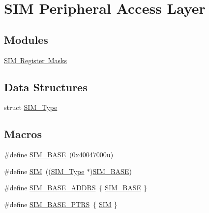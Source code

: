 \hypertarget{group___s_i_m___peripheral___access___layer}{}\section{S\+IM Peripheral Access Layer}
\label{group___s_i_m___peripheral___access___layer}
\subsection*{Modules}
\begin{DoxyCompactItemize}
\item 
\mbox{\hyperlink{group___s_i_m___register___masks}{S\+I\+M Register Masks}}
\end{DoxyCompactItemize}
\subsection*{Data Structures}
\begin{DoxyCompactItemize}
\item 
struct \mbox{\hyperlink{struct_s_i_m___type}{S\+I\+M\+\_\+\+Type}}
\end{DoxyCompactItemize}
\subsection*{Macros}
\begin{DoxyCompactItemize}
\item 
\#define \mbox{\hyperlink{group___s_i_m___peripheral___access___layer_gace1d6947a3e5c9530f00f8c22adcd700}{S\+I\+M\+\_\+\+B\+A\+SE}}~(0x40047000u)
\item 
\#define \mbox{\hyperlink{group___s_i_m___peripheral___access___layer_ga3dd2f4c4bfb41778902b4b5350143d9e}{S\+IM}}~((\mbox{\hyperlink{struct_s_i_m___type}{S\+I\+M\+\_\+\+Type}} $\ast$)\mbox{\hyperlink{group___s_i_m___peripheral___access___layer_gace1d6947a3e5c9530f00f8c22adcd700}{S\+I\+M\+\_\+\+B\+A\+SE}})
\item 
\#define \mbox{\hyperlink{group___s_i_m___peripheral___access___layer_gad0dfdd9f125421e6e0387da3fce02a5d}{S\+I\+M\+\_\+\+B\+A\+S\+E\+\_\+\+A\+D\+D\+RS}}~\{ \mbox{\hyperlink{group___s_i_m___peripheral___access___layer_gace1d6947a3e5c9530f00f8c22adcd700}{S\+I\+M\+\_\+\+B\+A\+SE}} \}
\item 
\#define \mbox{\hyperlink{group___s_i_m___peripheral___access___layer_ga2fd213a3b9fc7d761ab0cdeb74c34f91}{S\+I\+M\+\_\+\+B\+A\+S\+E\+\_\+\+P\+T\+RS}}~\{ \mbox{\hyperlink{group___s_i_m___peripheral___access___layer_ga3dd2f4c4bfb41778902b4b5350143d9e}{S\+IM}} \}
\end{DoxyCompactItemize}


